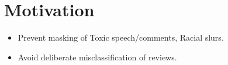 \section{Motivation}\label{sec:mtiv}
\begin{frame}{}
\justifying

\begin{itemize}
    \item Prevent masking of Toxic speech/comments, Racial slurs.
    \item Avoid deliberate misclassification of reviews.
\end{itemize}

\end{frame}